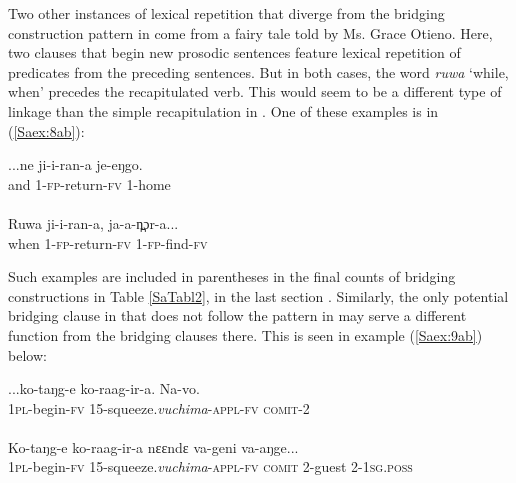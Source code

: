 \documentclass[output=paper]{LSP/langsci}
\begin{document}
Two other instances of lexical repetition that diverge from the bridging construction pattern in  come from a fairy tale told by Ms. Grace Otieno. Here, two clauses that begin new prosodic sentences feature lexical repetition of predicates from the preceding sentences. But in both cases, the word \textit{ruwa} `while, when' precedes the recapitulated verb. This would seem to be a different type of linkage than the simple recapitulation in . One of these examples is in (\ref{Saex:8ab}):
 
\begin{exe}
\ex \label{Saex:8ab}
\begin{xlist}
\ex \label{Saex:8a}
\gll ...ne  ji-i-ran-a  je-eŋgo. \\
and  1-\textsc{fp}{}-return-\textsc{fv}  1-home\\
\glt {}\\
\ex \label{Saex:8b}
\gll Ruwa  ji-i-ran-a,  ja-a-n̪ɔr-a...\\     	       
   when  1-\textsc{fp}{}-return-\textsc{fv}  1-\textsc{fp}{}-find-\textsc{fv}\\
\glt {} 
\end{xlist}
\end{exe}

Such examples are included in parentheses in the final counts of bridging constructions in Table \ref{SaTabl2}, in the last section . Similarly, the only potential bridging clause in \citet{Chesi2014} that does not follow the pattern in  may serve a different function from the bridging clauses there. This is seen in example (\ref{Saex:9ab}) below:

\begin{exe}
\ex \label{Saex:9ab}
\begin{xlist}
\ex \label{Saex:9a}
\gll ...ko-taŋg-e ko-raag-ir-a. Na-vo. \\
1\textsc{pl}-begin-\textsc{fv} 15-squeeze.\textit{vuchima}-\textsc{appl-fv} \textsc{comit-2}\\
\glt {}\\
\ex \label{Saex:9b}
\gll Ko-taŋg-e ko-raag-ir-a nɛɛndɛ va-geni va-aŋge...\\     	       
   \textsc{1pl-}begin-\textsc{fv} 15-squeeze.\textit{vuchima}-\textsc{appl-fv} \textsc{comit} 2-guest 2-\textsc{1sg.poss}\\
\glt {} 
\end{xlist}
\end{exe}
\end{document}
